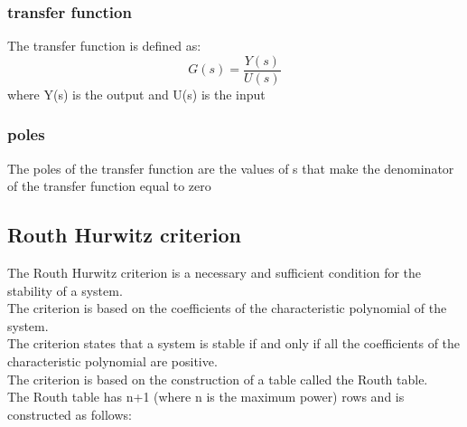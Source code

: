 \documentclass[a4paper,12pt]{article}
\begin{document}
\subsubsection{transfer function}
The transfer function is defined as:
\begin{equation}
    G(s) = \frac{Y(s)}{U(s)}
\end{equation}
where Y(s) is the output and U(s) is the input
\subsubsection{poles}
The poles of the transfer function are the values of s 
that make the denominator of the transfer function equal to zero
\
\subsection{Routh Hurwitz criterion}
The Routh Hurwitz criterion is a necessary and sufficient
 condition for the stability of a system.\\
    The criterion is based on the coefficients of the characteristic
        polynomial of the system.\\
        The criterion states that a system is stable if and only if all the 
        coefficients of the characteristic polynomial are positive.\\
        The criterion is based on the construction of a table called the 
        Routh table.\\
        The Routh table has n+1 (where n is the maximum power) 
        rows and is constructed as follows:
\end{document}
